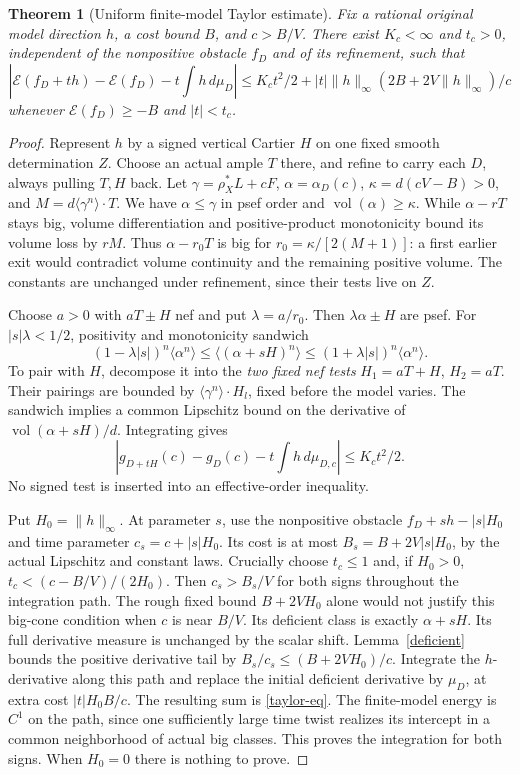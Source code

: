 \documentclass[10pt]{article}
\newtheorem{theorem}{Theorem}[section]
\newcommand{\vol}{\operatorname{vol}}
\begin{document}
\begin{theorem}[Uniform finite-model Taylor estimate]\label{taylor}
Fix a rational original model direction $h$, a cost bound $B$, and
$c>B/V$. There exist $K_c<\infty$ and $t_c>0$, independent of the
nonpositive obstacle $f_D$ and of its refinement, such that
\begin{equation}\label{taylor-eq}
 |\mathscr E(f_D+th)-\mathscr E(f_D)-t\int h\,d\mu_D|
 \leq K_ct^2/2+|t|\|h\|_\infty(2B+2V\|h\|_\infty)/c
\end{equation}
whenever $\mathscr E(f_D)\geq-B$ and $|t|<t_c$.
\end{theorem}
\begin{proof}
Represent $h$ by a signed vertical Cartier $H$ on one fixed smooth
determination $Z$. Choose an actual ample $T$ there, and refine to carry
each $D$, always pulling $T,H$ back. Let
$\gamma=\rho_X^*L+cF$, $\alpha=\alpha_D(c)$,
$\kappa=d(cV-B)>0$, and $M=d\langle\gamma^n\rangle\cdot T$.
We have $\alpha\leq\gamma$ in psef order and $\vol(\alpha)\geq\kappa$.
While $\alpha-rT$ stays big, volume differentiation and positive-product
monotonicity bound its volume loss by $rM$. Thus
$\alpha-r_0T$ is big for $r_0=\kappa/[2(M+1)]$: a first earlier exit
would contradict volume continuity and the remaining positive volume.
The constants are unchanged under refinement, since their tests live on $Z$.

Choose $a>0$ with $aT\pm H$ nef and put $\lambda=a/r_0$.
Then $\lambda\alpha\pm H$ are psef. For $|s|\lambda<1/2$, positivity
and monotonicity sandwich
\[
 (1-\lambda|s|)^n\langle\alpha^n\rangle
 \leq\langle(\alpha+sH)^n\rangle
 \leq(1+\lambda|s|)^n\langle\alpha^n\rangle.
\]
To pair with $H$, decompose it into the \emph{two fixed nef tests}
$H_1=aT+H$, $H_2=aT$. Their pairings are bounded by
$\langle\gamma^n\rangle\cdot H_l$, fixed before the model varies.
The sandwich implies a common Lipschitz bound on the derivative of
$\vol(\alpha+sH)/d$. Integrating gives
\[
 |g_{D+tH}(c)-g_D(c)-t\int h\,d\mu_{D,c}|\leq K_ct^2/2.
\]
No signed test is inserted into an effective-order inequality.

Put $H_0=\|h\|_\infty$. At parameter $s$, use the nonpositive obstacle
$f_D+sh-|s|H_0$ and time parameter $c_s=c+|s|H_0$. Its cost is at
most $B_s=B+2V|s|H_0$, by the actual Lipschitz and constant laws.
Crucially choose $t_c\leq1$ and, if $H_0>0$,
$t_c<(c-B/V)/(2H_0)$. Then $c_s>B_s/V$ for both signs throughout
the integration path. The rough fixed bound $B+2VH_0$ alone would
not justify this big-cone condition when $c$ is near $B/V$.
Its deficient class is exactly $\alpha+sH$. Its full derivative measure
is unchanged by the scalar shift. Lemma~\ref{deficient} bounds the
positive derivative tail by $B_s/c_s\leq(B+2VH_0)/c$.
Integrate the $h$-derivative along this path and replace the initial
deficient derivative by $\mu_D$, at extra cost $|t|H_0B/c$.
The resulting sum is \eqref{taylor-eq}. The finite-model energy is $C^1$
on the path, since one sufficiently large time twist realizes its
intercept in a common neighborhood of actual big classes. This proves
the integration for both signs. When $H_0=0$ there is nothing to prove.
\end{proof}
\end{document}
